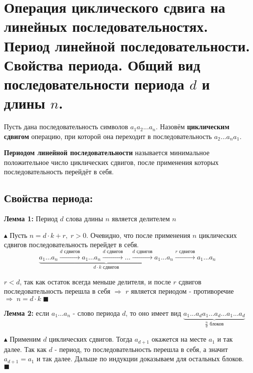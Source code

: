 \setcounter{section}{39}

\section{Операция циклического сдвига на линейных последовательностях. Период линейной последовательности. Свойства периода. Общий вид последовательности периода $d$ и длины $n$.}
\par Пусть дана последовательность символов $a_1 a_2 ... a_n$. Назовём \textbf{циклическим сдвигом} операцию, при которой она переходит в последовательность $a_2 ... a_n a_1$.
\par \textbf{Периодом линейной последовательности} называется минимальное положительное число циклических сдвигов, после применения которых последовательность перейдёт в себя.
\subsection*{Свойства периода:}
\par \textbf{Лемма 1:} Период $d$ слова длины $n$ является делителем $n$
\par $\blacktriangle$ Пусть $n=d \cdot k+r, \; r>0$. Очевидно, что после применения $n$ циклических сдвигов последовательность перейдет в себя. $$\underbrace{a_1...a_n \xrightarrow{d \text{ сдвигов}} a_1...a_n \xrightarrow{d \text{ сдвигов}} ... \xrightarrow{d \text{ сдвигов}} a_1...a_n}_{d \cdot k \text{ сдвигов}}\xrightarrow{r \text{ сдвигов}} a_1...a_n$$
\par $r < d$, так как остаток всегда меньше делителя, и после $r$ сдвигов последовательность перешла в себя $\Rightarrow$ $r$ является периодом - противоречие $\Rightarrow \; n=d \cdot k \; \blacksquare$
\par \textbf{Лемма 2:} если $a_1...a_n$ - слово периода $d$, то оно имеет вид $\underbrace{a_1...a_da_1...a_d...a_1...a_d}_{\frac{n}{d} \text{ блоков}}$
\par $\blacktriangle$ Применим $d$ циклических сдвигов. Тогда $a_{d+1}$ окажется на месте $a_1$ и так далее. Так как $d$ - период, то последовательность перешла в себя, а значит $a_{d+1}=a_1$ и так далее. Дальше по индукции доказываем для остальных блоков. $\blacksquare$


